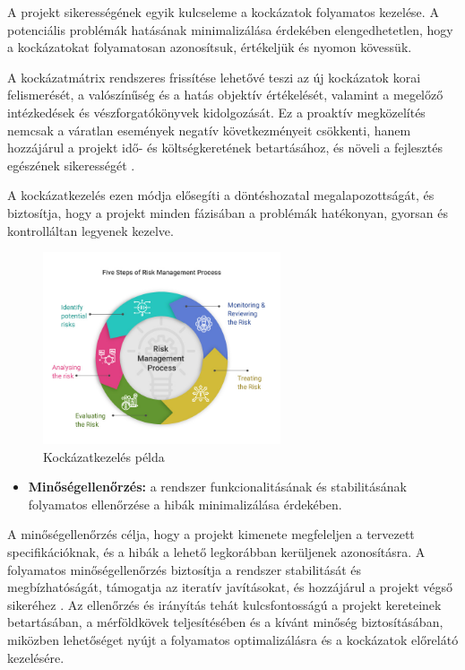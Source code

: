 A projekt sikerességének egyik kulcseleme a kockázatok folyamatos kezelése.  
A potenciális problémák hatásának minimalizálása érdekében elengedhetetlen, hogy a kockázatokat folyamatosan azonosítsuk, értékeljük és nyomon kövessük.  

A kockázatmátrix rendszeres frissítése lehetővé teszi az új kockázatok korai felismerését,  
a valószínűség és a hatás objektív értékelését, valamint a megelőző intézkedések és vészforgatókönyvek kidolgozását.  
Ez a proaktív megközelítés nemcsak a váratlan események negatív következményeit csökkenti,  
hanem hozzájárul a projekt idő- és költségkeretének betartásához, és növeli a fejlesztés egészének sikerességét \cite{Hajdu2014,Szalay2018}.  

A kockázatkezelés ezen módja elősegíti a döntéshozatal megalapozottságát,  
és biztosítja, hogy a projekt minden fázisában a problémák hatékonyan, gyorsan és kontrolláltan legyenek kezelve.

\begin{figure}[H]
    \centering
    \includegraphics[width=70mm, keepaspectratio]{figures/risk.jpg}
    \caption{Kockázatkezelés példa}
    \label{fig:risk}
\end{figure}

\begin{itemize}
    \item \textbf{Minőségellenőrzés:} a rendszer funkcionalitásának és stabilitásának folyamatos ellenőrzése a hibák minimalizálása érdekében.
\end{itemize}

A minőségellenőrzés célja, hogy a projekt kimenete megfeleljen a tervezett specifikációknak, és a hibák a lehető 
legkorábban kerüljenek azonosításra. A folyamatos minőségellenőrzés biztosítja a rendszer 
stabilitását és megbízhatóságát, támogatja az iteratív javításokat, és hozzájárul a projekt végső sikeréhez \cite{Kovacs2016,Kaposi2019,Szalay2018}.
Az ellenőrzés és irányítás tehát kulcsfontosságú a projekt kereteinek betartásában, a mérföldkövek teljesítésében és a 
kívánt minőség biztosításában, miközben lehetőséget nyújt a folyamatos optimalizálásra és a kockázatok előrelátó kezelésére.


